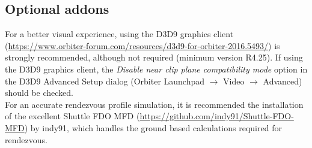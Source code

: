 \documentclass[Space_Shuttle_Vessel_Manual.tex]{subfiles}
\begin{document}
\begin{multicols*}{2}
\subsection{Optional addons}
For a better visual experience, using the D3D9 graphics client (\url{https://www.orbiter-forum.com/resources/d3d9-for-orbiter-2016.5493/}) is strongly recommended, although not required (minimum version R4.25). If using the D3D9 graphics client, the \textit{Disable near clip plane compatibility mode} option in the D3D9 Advanced Setup dialog (Orbiter Launchpad $\rightarrow$ Video $\rightarrow$ Advanced) should be checked.\\
For an accurate rendezvous profile simulation, it is recommended the installation of the excellent Shuttle FDO MFD (\url{https://github.com/indy91/Shuttle-FDO-MFD}) by indy91, which handles the ground based calculations required for rendezvous.\\
\end{multicols*}
\end{document}
